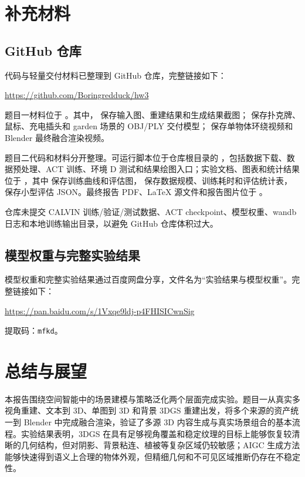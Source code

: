\documentclass[12pt,a4paper]{ctexart}
\begin{document}
\section{补充材料}

\subsection{GitHub 仓库}

代码与轻量交付材料已整理到 GitHub 仓库，完整链接如下：
\begin{center}
{\small \url{https://github.com/Boringredduck/hw3}}
\end{center}

题目一材料位于 。其中， 保存输入图、重建结果和生成结果截图； 保存扑克牌、鼠标、充电插头和 garden 场景的 OBJ/PLY 交付模型； 保存单物体环绕视频和 Blender 最终融合渲染视频。

题目二代码和材料分开整理。可运行脚本位于仓库根目录的 ，包括数据下载、数据预处理、ACT 训练、环境 D 测试和结果绘图入口；实验文档、图表和统计结果位于 ，其中  保存训练曲线和评估图， 保存数据规模、训练耗时和评估统计表， 保存小型评估 JSON。最终报告 PDF、LaTeX 源文件和报告图片位于 。

仓库未提交 CALVIN 训练/验证/测试数据、ACT checkpoint、模型权重、wandb 日志和本地训练输出目录，以避免 GitHub 仓库体积过大。

\subsection{模型权重与完整实验结果}

模型权重和完整实验结果通过百度网盘分享，文件名为“实验结果与模型权重”。完整链接如下：
\begin{center}
{\small \url{https://pan.baidu.com/s/1Vxqe9ldj-p4FHISICwnSig}}
\end{center}
提取码：\texttt{mfkd}。

\section{总结与展望}

本报告围绕空间智能中的场景建模与策略泛化两个层面完成实验。题目一从真实多视角重建、文本到 3D、单图到 3D 和背景 3DGS 重建出发，将多个来源的资产统一到 Blender 中完成融合渲染，验证了多源 3D 内容生成与真实场景组合的基本流程。实验结果表明，3DGS 在具有足够视角覆盖和稳定纹理的目标上能够恢复较清晰的几何结构，但对阴影、背景粘连、植被等复杂区域仍较敏感；AIGC 生成方法能够快速得到语义上合理的物体外观，但精细几何和不可见区域推断仍存在不稳定性。
\end{document}
